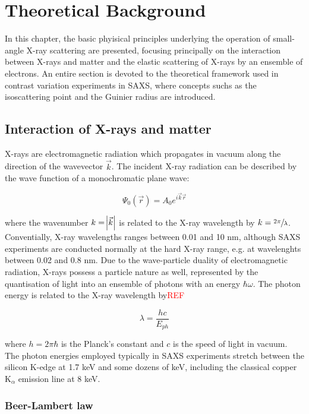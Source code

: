 \chapter{Theoretical Background}
\label{chap:theory_SAXS}
In this chapter, the basic phyisical principles underlying the operation of small-angle X-ray scattering are presented, focusing principally on the interaction between X-rays and matter and the elastic scattering of X-rays by an ensemble of electrons. An entire section is devoted to the theoretical framework used in contrast variation experiments in SAXS, where concepts suchs as the isoscattering point and the Guinier radius are introduced.

\section{Interaction of X-rays and matter}

X-rays are electromagnetic radiation which propagates in vacuum along the direction of the wavevector $\vec{k}$. The incident X-ray radiation can be described by the wave function of a monochromatic plane wave:

\begin{equation}
        \Psi_0\left( \vec{r} \right)=A_0 e^{i \vec{k}\vec{r} }
\end{equation}

where the wavenumber $k=\abs{\vec{k}}$ is related to the X-ray wavelength by $k=\sfrac{2\pi}{\lambda}$. Conventially, X-ray wavelengths ranges between 0.01 and 10 nm, although SAXS experiments are conducted normally at the hard X-ray range, e.g. at wavelenghts between 0.02 and 0.8 nm. Due to the wave-particle duality of electromagnetic radiation, X-rays possess a particle nature as well, represented by the quantisation of light into an ensemble of photons with an energy $\hbar \omega$. The photon energy is related to the X-ray wavelength by\textcolor{red}{REF}

\begin{equation}
        \lambda = \frac{h c}{E_{ph}}
\end{equation}

where $h=2\pi\hbar$ is the Planck's constant and $c$ is the speed of light in vacuum. The photon energies employed typically in SAXS experiments stretch between the silicon K-edge at 1.7 keV and some dozens of keV, including the classical copper K$_{\alpha}$ emission line at 8 keV.

\subsection{Beer-Lambert law}
\label{sec:BeerLambert}

